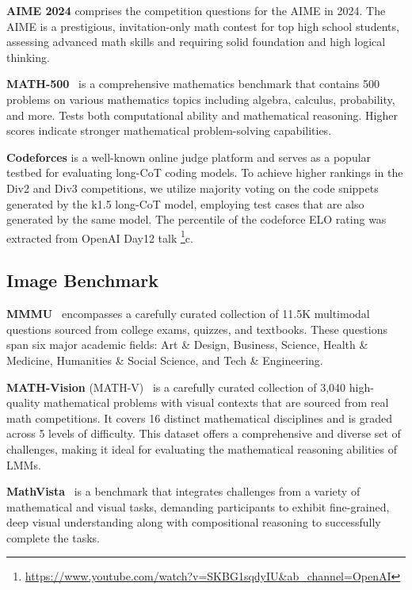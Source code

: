 \documentclass{article}
\newcommand{\citep}[1]{\parencite{#1}}
\begin{document}
\textbf{AIME 2024} comprises the competition questions for the AIME in 2024. The AIME is a prestigious, invitation-only math contest for top high school students, assessing advanced math skills and requiring solid foundation and high logical thinking.

\textbf{MATH-500}~\citep{lightman2023lets} is a comprehensive mathematics benchmark that contains 500 problems on various mathematics topics including algebra, calculus, probability, and more. Tests both computational ability and mathematical reasoning. Higher scores indicate stronger mathematical problem-solving capabilities. 

\textbf{Codeforces} is a well-known online judge platform and serves as a popular testbed for evaluating long-CoT coding models. To achieve higher rankings in the Div2 and Div3 competitions, we utilize majority voting on the code snippets generated by the k1.5 long-CoT model, employing test cases that are also generated by the same model. The percentile of the codeforce ELO rating was extracted from OpenAI Day12 talk \footnote{\url{https://www.youtube.com/watch?v=SKBG1sqdyIU&ab_channel=OpenAI}}c.

\subsection{Image Benchmark}

\textbf{MMMU}~\citep{yue2024mmmu} encompasses a carefully curated collection of 11.5K multimodal questions sourced from college exams, quizzes, and textbooks. These questions span six major academic fields: Art \& Design, Business, Science, Health \& Medicine, Humanities \& Social Science, and Tech \& Engineering.

\textbf{MATH-Vision} (MATH-V)~\citep{wang2024measuring} is a carefully curated collection of 3,040 high-quality mathematical problems with visual contexts that are sourced from real math competitions. It covers 16 distinct mathematical disciplines and is graded across 5 levels of difficulty. This dataset offers a comprehensive and diverse set of challenges, making it ideal for evaluating the mathematical reasoning abilities of LMMs.

\textbf{MathVista}~\citep{lu2023mathvista} is a benchmark that integrates challenges from a variety of mathematical and visual tasks, demanding participants to exhibit fine-grained, deep visual understanding along with compositional reasoning to successfully complete the tasks.
\end{document}

